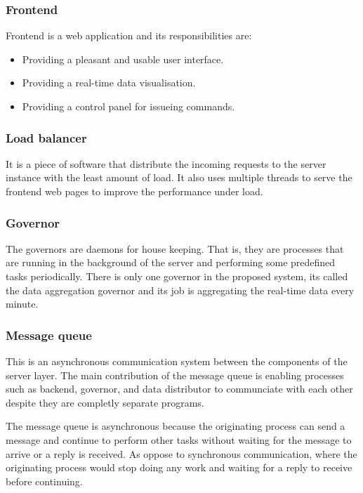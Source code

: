 \documentclass[../thesis.tex]{subfiles}
\begin{document}
\subsubsection{Frontend}

Frontend is a web application and its responsibilities are: 

\begin{itemize}
	\item Providing a pleasant and usable user interface.
	\item Providing a real-time data visualisation.
	\item Providing a control panel for issueing commands.
\end{itemize}

\subsubsection{Load balancer}

It is a piece of software that distribute the incoming requests to the server instance with the least amount of load. It also uses multiple threads to serve the frontend web pages to improve the performance under load.

\subsubsection{Governor}

The governors are daemons for house keeping. That is, they are processes that are running in the background of the server and performing some predefined tasks periodically. There is only one governor in the proposed system, its called the data aggregation governor and its job is aggregating the real-time data every minute. 

\subsubsection{Message queue}

This is an asynchronous communication system between the components of the server layer. The main contribution of the message queue is enabling processes such as backend, governor, and data distributor to communciate with each other despite they are completly separate programs. 

The message queue is asynchronous because the originating process can send a message and continue to perform other tasks without waiting for the message to arrive or a reply is received. As oppose to synchronous communication, where the originating process would stop doing any work and waiting for a reply to receive before continuing.
\end{document}
